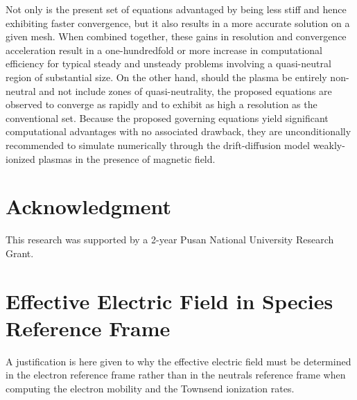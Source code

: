 \documentclass[twoside,onecolumn,10pt]{waflarticle}
\begin{document}
Not only is the present set of equations advantaged by being less stiff and hence exhibiting faster convergence, but it also results in a more accurate solution on a given mesh. When combined together, these gains in resolution and convergence acceleration result in a one-hundredfold or more increase in computational efficiency for typical steady and unsteady problems involving a quasi-neutral region of substantial size. On the other hand, should the plasma be entirely non-neutral and not include zones  of quasi-neutrality, the proposed equations are observed to converge as rapidly and to exhibit as high a resolution as the conventional set. Because the proposed governing equations yield significant computational advantages with no associated drawback, they are  unconditionally recommended to simulate numerically through the drift-diffusion model weakly-ionized plasmas in the presence of magnetic field.   




\section*{Acknowledgment}

This research was supported by a 2-year Pusan National University Research Grant. 




\appendix









\section{Effective Electric Field in Species Reference Frame}
\label{AppendixA}


A justification is here given to why the effective electric field must be determined in the electron reference frame rather than in the neutrals reference frame when computing the electron mobility and the Townsend ionization rates. 
\end{document}
